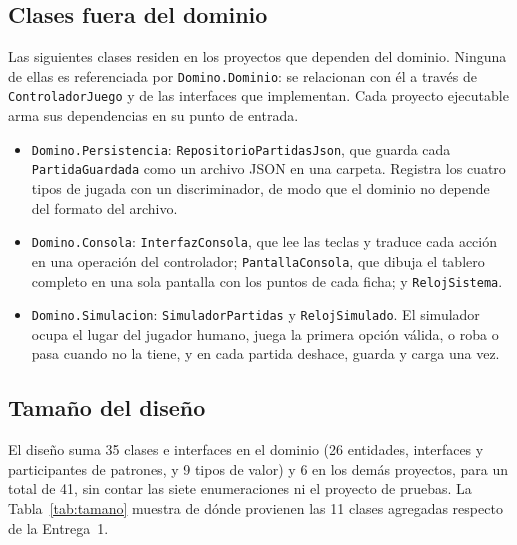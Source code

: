 \subsection{Clases fuera del dominio}

Las siguientes clases residen en los proyectos que dependen del dominio. Ninguna de ellas es referenciada por \texttt{Domino.Dominio}: se relacionan con él a través de \texttt{ControladorJuego} y de las interfaces que implementan. Cada proyecto ejecutable arma sus dependencias en su punto de entrada.

\begin{itemize}
  \item \texttt{Domino.Persistencia}: \texttt{RepositorioPartidasJson}, que guarda cada \texttt{PartidaGuardada} como un archivo JSON en una carpeta. Registra los cuatro tipos de jugada con un discriminador, de modo que el dominio no depende del formato del archivo.
  \item \texttt{Domino.Consola}: \texttt{InterfazConsola}, que lee las teclas y traduce cada acción en una operación del controlador; \texttt{PantallaConsola}, que dibuja el tablero completo en una sola pantalla con los puntos de cada ficha; y \texttt{RelojSistema}.
  \item \texttt{Domino.Simulacion}: \texttt{SimuladorPartidas} y \texttt{RelojSimulado}. El simulador ocupa el lugar del jugador humano, juega la primera opción válida, o roba o pasa cuando no la tiene, y en cada partida deshace, guarda y carga una vez.
\end{itemize}

\subsection{Tamaño del diseño}

El diseño suma 35 clases e interfaces en el dominio (26 entidades, interfaces y participantes de patrones, y 9 tipos de valor) y 6 en los demás proyectos, para un total de 41, sin contar las siete enumeraciones ni el proyecto de pruebas. La Tabla~\ref{tab:tamano} muestra de dónde provienen las 11 clases agregadas respecto de la Entrega~1.

